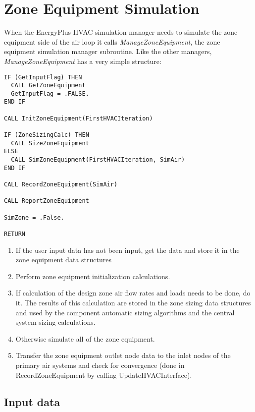 \section{Zone Equipment Simulation}\label{zone-equipment-simulation}

When the EnergyPlus HVAC simulation manager needs to simulate the zone equipment side of the air loop it calls \emph{ManageZoneEquipment}, the zone equipment simulation manager subroutine. Like the other managers, \emph{ManageZoneEquipment} has a very simple structure:

\begin{lstlisting}
IF (GetInputFlag) THEN
  CALL GetZoneEquipment
  GetInputFlag = .FALSE.
END IF

CALL InitZoneEquipment(FirstHVACIteration)

IF (ZoneSizingCalc) THEN
  CALL SizeZoneEquipment
ELSE
  CALL SimZoneEquipment(FirstHVACIteration, SimAir)
END IF

CALL RecordZoneEquipment(SimAir)
 
CALL ReportZoneEquipment

SimZone = .False.

RETURN
\end{lstlisting}

\begin{enumerate}
\def\labelenumi{\arabic{enumi}.}
\item
  If the user input data has not been input, get the data and store it in the zone equipment data structures
\item
  Perform zone equipment initialization calculations.
\item
  If calculation of the design zone air flow rates and loads needs to be done, do it. The results of this calculation are stored in the zone sizing data structures and used by the component automatic sizing algorithms and the central system sizing calculations.
\item
  Otherwise simulate all of the zone equipment.
\item
  Transfer the zone equipment outlet node data to the inlet nodes of the primary air systems and check for convergence (done in RecordZoneEquipment by calling UpdateHVACInterface).
\end{enumerate}

\subsection{Input data}\label{input-data-000}

